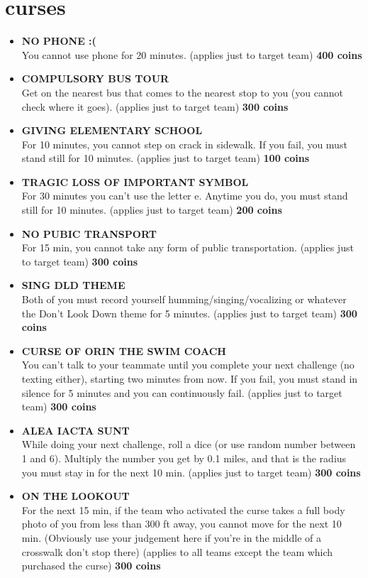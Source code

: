 \documentclass{article}
\begin{document}
\section{curses}
\begin{itemize}
    \setcounter{enumi}{-1}
    \item \textbf{NO PHONE :(} \\ You cannot use phone for 20 minutes. (applies just to target team) \textbf{400 coins }
    \item \textbf{COMPULSORY BUS TOUR} \\Get on the nearest bus that comes to the nearest stop to you (you cannot check where it goes). (applies just to target team) \textbf{300 coins}
    \item \textbf{GIVING ELEMENTARY SCHOOL} \\ For 10 minutes, you cannot step on crack in sidewalk. If you fail, you must stand still for 10 minutes. (applies just to target team) \textbf{100 coins} 
    \item \textbf{TRAGIC LOSS OF IMPORTANT SYMBOL} \\ For 30 minutes you can't use the letter e. Anytime you do, you must stand still for 10 minutes. (applies just to target team) \textbf{200 coins}
    \item \textbf{NO PUBIC TRANSPORT} \\ For 15 min, you cannot take any form of public transportation. (applies just to target team) \textbf{300 coins}
    \item \textbf{SING DLD THEME} \\ Both of you must record yourself humming/singing/vocalizing or whatever the Don't Look Down theme for 5 minutes. (applies just to target team) \textbf{300 coins}
    \item \textbf{CURSE OF ORIN THE SWIM COACH} \\ You can't talk to your teammate until you complete your next challenge (no texting either), starting two minutes from now. If you fail, you must stand in silence for 5 minutes and you can continuously fail. (applies just to target team) \textbf{300 coins}
    \item \textbf{ALEA IACTA SUNT} \\ While doing your next challenge, roll a dice (or use random number between 1 and 6). Multiply the number you get by 0.1 miles, and that is the radius you must stay in for the next 10 min. (applies just to target team) \textbf{300 coins}
    \item \textbf{ON THE LOOKOUT} \\ For the next 15 min, if the team who activated the curse takes a full body photo of you from less than 300 ft away, you cannot move for the next 10 min. (Obviously use your judgement here if you're in the middle of a crosswalk don't stop there) (applies to all teams except the team which purchased the curse) \textbf{300 coins}
\end{itemize}
\end{document}
